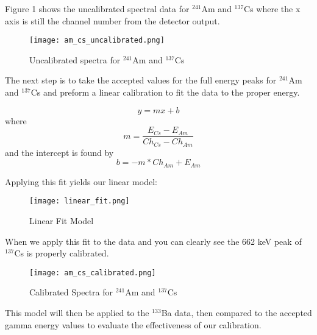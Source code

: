 Figure 1 shows the uncalibrated spectral data for $^{241}$Am and $^{137}$Cs where the x axis is still
the channel number from the detector output.

\begin{figure}[H]
  \centering
  \texttt{[image: am\_cs\_uncalibrated.png]}
  \caption{Uncalibrated spectra for $^{241}$Am and $^{137}$Cs}
  \label{fig:uncalspectra}
\end{figure}


The next step is to take the accepted values for the full energy peaks for $^{241}$Am and $^{137}$Cs and preform
a linear calibration to fit the data to the proper energy.
\begin{center}
  \begin{equation}
    \label{eq:cal}
    y = mx+b
  \end{equation}
  where
  \begin{equation}
    \label{eq:slope}
    m = \frac{E_{Cs} - E_{Am}}{Ch_{Cs}-Ch_{Am}}
  \end{equation}
  and the intercept is found by
  \begin{equation}
    \label{eq:slope}
    b = -m*Ch_{Am} + E_{Am}
  \end{equation}
\end{center}
\newpage
  Applying this fit yields our linear model:

\begin{figure}[H]
  \begin{center}
    \texttt{[image: linear\_fit.png]}
    \caption{\label{fig:linfit}Linear Fit Model}
  \end{center}
\end{figure}


 When we apply this fit to the data and you can clearly see the 662 keV peak of $^{137}$Cs is properly calibrated.

 \begin{figure}[H]
   \begin{center}
     \texttt{[image: am\_cs\_calibrated.png]}
     \caption{\label{fig:linfit}Calibrated Spectra for $^{241}$Am and $^{137}$Cs }
   \end{center}
 \end{figure}

 This model will then be applied to the $^{133}$Ba data, then compared to the accepted gamma energy values to
 evaluate the effectiveness of our calibration.

